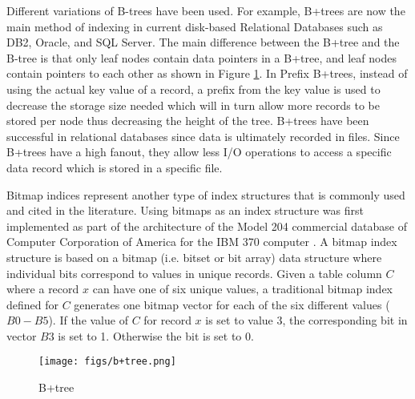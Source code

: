 \documentclass[12pt,a4paper]{article}
\begin{document}
Different variations of B-trees have been used. For example, B+trees are now the main method of indexing in current disk-based Relational Databases
\cite{lightstone2007physical} such as DB2, Oracle, and SQL Server. The main difference between the B+tree and the B-tree is that only leaf nodes contain
data pointers in a B+tree, and leaf nodes contain pointers to each other as shown in Figure \ref{fig:b+tree}. In Prefix B+trees, instead of using the actual key
value of a record, a prefix from the key value is used to decrease the storage size needed which will in turn allow more records to be stored per node thus
decreasing the height of the tree. B+trees have been successful in relational databases since data is ultimately recorded in files. Since B+trees have a high
fanout, they allow less I/O operations to access a specific data record which is stored in a specific file.

Bitmap indices represent another type of index structures that is commonly used and cited in the literature. Using bitmaps as an index structure was first
implemented as part of the architecture of the Model 204 commercial database of Computer Corporation of America for the IBM 370 computer
\cite{patrick1987model}.
A bitmap index structure is based on a bitmap (i.e. bitset or bit array) data structure where individual bits correspond to values in unique records. Given a
table column $C$ where a record $x$ can have one of six unique values, a traditional bitmap index defined for $C$ generates one bitmap vector for each of the
six different values ($B0-B5$). If the value of $C$ for record $x$ is set to value 3, the corresponding bit in vector $B3$ is set to 1. Otherwise the bit is set
to 0.

\begin{figure}[!t]
\centering
\texttt{[image: figs/b+tree.png]}
\caption{B+tree}
\label{fig:b+tree}
\end{figure}
\end{document}
